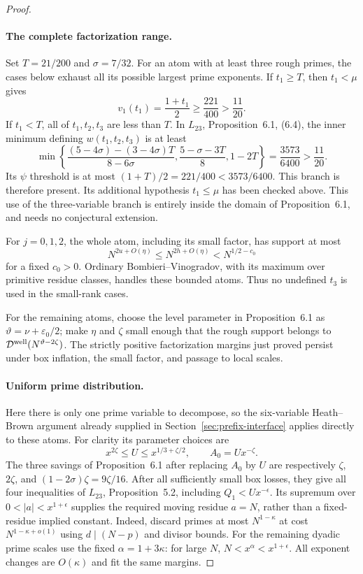 \documentclass[11pt]{article}
\begin{document}
\begin{proof}
\paragraph{The complete factorization range.}
Set $T=21/200$ and $\sigma=7/32$. For an atom with at least three
rough primes, the cases below exhaust all its possible largest
prime exponents. If $t_1\ge T$, then $t_1<\mu$ gives
\[
 v_1(t_1)=\frac{1+t_1}{2}\ge\frac{221}{400}
 >\frac{11}{20}.
\]
If $t_1<T$, all of $t_1,t_2,t_3$ are less than $T$.
In $L_{23}$, Proposition~6.1, (6.4), the inner minimum defining
$w(t_1,t_2,t_3)$ is at least
\[
 \min\left\{
 \frac{(5-4\sigma)-(3-4\sigma)T}{8-6\sigma},
 \frac{5-\sigma-3T}{8},1-2T\right\}
 =\frac{3573}{6400}>\frac{11}{20}.
\]
Its $\psi$ threshold is at most
$(1+T)/2=221/400<3573/6400$. This branch is therefore present.
Its additional hypothesis $t_1\le\mu$ has been checked above.
This use of the three-variable branch is entirely inside the
domain of Proposition~6.1, and needs no conjectural extension.

For $j=0,1,2$, the whole atom, including its small factor, has
support at most
\[
 N^{2u+O(\eta)}\le N^{2h+O(\eta)}<N^{1/2-c_0}
\]
for a fixed $c_0>0$. Ordinary Bombieri--Vinogradov, with its
maximum over primitive residue classes, handles these bounded
atoms. Thus no undefined $t_3$ is used in the small-rank cases.

For the remaining atoms, choose the level parameter in
Proposition~6.1 as $\vartheta=\nu+\varepsilon_0/2$; make $\eta$
and $\zeta$ small enough that the rough support belongs to
$\mathcal D^{\rm well}(N^{\vartheta-2\zeta})$.
The strictly positive factorization margins just proved persist
under box inflation, the small factor, and passage to local scales.

\paragraph{Uniform prime distribution.}
Here there is only one prime variable to decompose, so the six-variable
Heath--Brown argument already supplied in
Section~\ref{sec:prefix-interface} applies directly to these atoms.
For clarity its parameter choices are
\[
 x^{2\zeta}\le U\le x^{1/3+\zeta/2},
 \qquad A_0=Ux^{-\zeta}.
\]
The three savings of Proposition~6.1 after replacing $A_0$ by $U$
are respectively $\zeta$, $2\zeta$, and
$(1-2\sigma)\zeta=9\zeta/16$. After all sufficiently small
box losses, they give all four inequalities of $L_{23}$,
Proposition~5.2, including $Q_1<Ux^{-\epsilon}$.
Its supremum over $0<|a|<x^{1+\epsilon}$ supplies the required
moving residue $a=N$, rather than a fixed-residue implied constant.
Indeed, discard primes at most $N^{1-\kappa}$ at cost
$N^{1-\kappa+o(1)}$ using $d\mid(N-p)$ and divisor bounds.
For the remaining dyadic prime scales use the fixed
$\alpha=1+3\kappa$: for large $N$, $N<x^\alpha<x^{1+\epsilon}$.
All exponent changes are $O(\kappa)$ and fit the same margins.


\end{proof}
\end{document}
